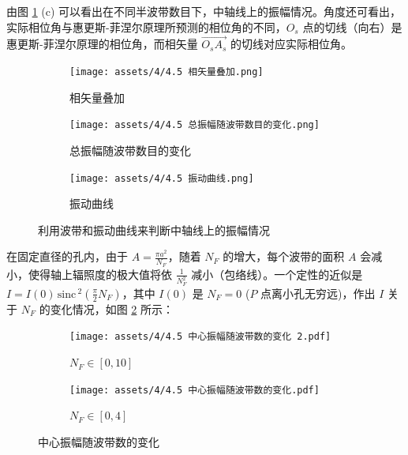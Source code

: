 \documentclass[UTF8]{report}
\def\sinc{\mathrm{\,sinc}\,}
\theoremstyle{MyLineTheoremStyle} %
\theoremstyle{MyBlockTheoremStyle} %
\theoremstyle{MySubsubsectionStyle} %
\begin{document}
由图 \ref{振动曲线} (c) 可以看出在不同半波带数目下，中轴线上的振幅情况。角度还可看出，实际相位角与惠更斯-菲涅尔原理所预测的相位角的不同，$O_s$ 点的切线（向右）是惠更斯-菲涅尔原理的相位角，而相矢量 $\overrightarrow{O_sA_s}$ 的切线对应实际相位角。

\begin{figure}[H]\centering
\begin{subfigure}[b]{0.33\columnwidth}\centering
    \texttt{[image: assets/4/4.5 相矢量叠加.png]}
    \caption{相矢量叠加}
\end{subfigure}
\begin{subfigure}[b]{0.33\columnwidth}\centering
    \texttt{[image: assets/4/4.5 总振幅随波带数目的变化.png]}
    \caption{总振幅随波带数目的变化}
\end{subfigure}
\begin{subfigure}[b]{0.33\columnwidth}\centering
    \texttt{[image: assets/4/4.5 振动曲线.png]}
    \caption{振动曲线}
\end{subfigure}
\caption{利用波带和振动曲线来判断中轴线上的振幅情况}
\label{振动曲线}
\end{figure}

在固定直径的孔内，由于 $A = \frac{\pi a^2}{N_F}$，随着 $N_F$ 的增大，每个波带的面积 $A$ 会减小，使得轴上辐照度的极大值将依 $\frac{1}{N_F^2}$ 减小（包络线）。一个定性的近似是 $I = I(0) \sinc^2 \left(\frac{\pi}{2}N_F\right)$，其中 $I(0)$ 是 $N_F = 0$ ($P$ 点离小孔无穷远)，作出 $I$ 关于 $N_F$ 的变化情况，如图 \ref{中心振幅随波带数的变化} 所示：

\begin{figure}[H]\centering
\begin{subfigure}[b]{0.5\columnwidth}\centering
    \texttt{[image: assets/4/4.5 中心振幅随波带数的变化 2.pdf]}
    \caption{$N_F \in [0, 10]$}
\end{subfigure}\hfill
\begin{subfigure}[b]{0.5\columnwidth}\centering
    \texttt{[image: assets/4/4.5 中心振幅随波带数的变化.pdf]}
    \caption{$N_F \in [0, 4]$}
\end{subfigure}
\caption{中心振幅随波带数的变化}
\label{中心振幅随波带数的变化}
\end{figure}
\end{document}
